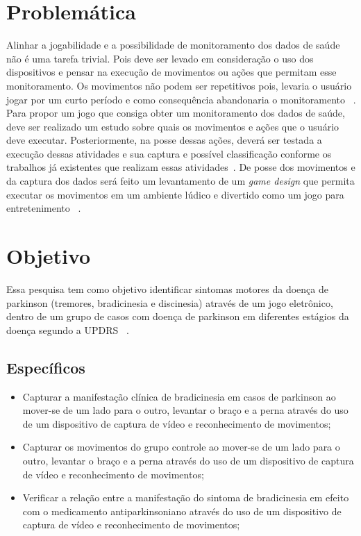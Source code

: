 \section{Problemática}
Alinhar a jogabilidade e a possibilidade de monitoramento dos dados de saúde não é uma tarefa trivial. Pois deve ser levado em consideração o uso dos dispositivos e pensar na execução de movimentos ou ações que permitam esse monitoramento. Os movimentos não podem ser repetitivos pois, levaria o usuário jogar por um curto período e como consequência abandonaria o monitoramento ~\cite{Suhonen:2008:SFE:1457199.1457204}. Para propor um jogo que consiga obter um monitoramento dos dados de saúde, deve ser realizado um estudo sobre quais os movimentos e ações que o usuário deve executar. Posteriormente, na posse dessas ações, deverá ser testada a execução dessas atividades e sua captura e possível classificação conforme os trabalhos já existentes que realizam essas atividades~\cite{Ballegaard:2008:HEL:1357054.1357336,albanese2012,bachlin_parkinsons_2009,visionbased2009,patel_monitoring_2009}. De posse dos movimentos e da captura dos dados será feito um levantamento de um \textit{game design} que permita executar os 
movimentos em  um ambiente lúdico e divertido como um jogo para entretenimento ~\cite{sweetser2005-gameflow}.


\section{Objetivo}
Essa pesquisa tem como objetivo identificar sintomas motores da doença de parkinson (tremores, bradicinesia e discinesia) através de um jogo eletrônico, dentro de um grupo de casos com doença de parkinson em diferentes estágios da doença segundo a UPDRS ~\cite{updrs87}.


\subsection{Específicos}
\begin{itemize}
 \item Capturar a  manifestação clínica de bradicinesia em casos de parkinson ao mover-se de um lado para o outro, levantar o braço e a perna através do uso de um dispositivo de captura de vídeo e reconhecimento de movimentos;
 \item Capturar os movimentos do grupo controle ao mover-se de um lado para o outro, levantar o braço e a perna através do uso de um dispositivo de captura de vídeo e reconhecimento de movimentos;
 \item Verificar a relação entre a manifestação do sintoma de bradicinesia em efeito com o medicamento antiparkinsoniano através do uso de um dispositivo de captura de vídeo e reconhecimento de movimentos;
\end{itemize}

